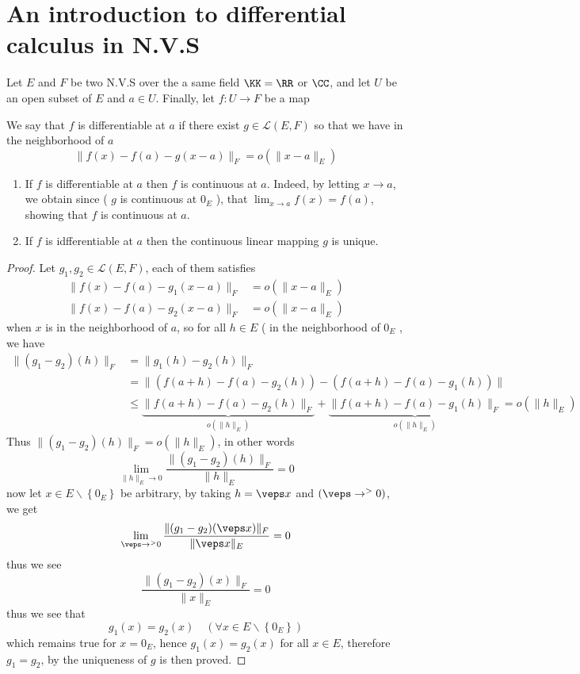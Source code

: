 \section{An introduction to differential calculus in N.V.S}
Let $E $ and $F $ be two N.V.S over the a same
field $\KK = \RR  $ or $\CC  $, and let $U $ be an open 
subset of $E $ and $a \in U $. Finally, let 
$ f : U \longrightarrow F $ be a map
\begin{definition}[]
We say that $f $ is differentiable at $a $ if there exist
$g \in  \mathcal{L} (E,F)$ so that we have
in the neighborhood of $a$
\[
\| f(x) -f(a)  - g(x-a)   \| _{F} = 
o \left( \| x-a \|_{E}  \right) 
\]
\end{definition}
\begin{remark}[]
\begin{enumerate}[(1)]
\item  If $f $ is differentiable at $a $ then 
	$f $ is continuous at $a $. Indeed, by letting
	$x \rightarrow a $, we obtain since ( $g $ is continuous
	at $0_{E} $ ), that $\lim_{x \to a} f(x) = f(a)  $, 
	showing that $f $ is continuous at $a $.
\item  If $f $ is idfferentiable at $a $ then the continuous
	linear mapping $g $ is unique.
\end{enumerate}
\end{remark}
\begin{proof}
	Let $g_1,g_2 \in \mathcal{L} (E,F)  $, each of them
	satisfies 
	\begin{align*}
		\| f(x) -f(a) - g_1(x-a)  \| _{F} &=
	o \left( \| x-a \|_{E}  \right)
	\\
		\| f(x) -f(a) - g_2(x-a)  \| _{F} &= 
	o \left( \| x-a \|_{E}  \right)
	\end{align*}
	when $x $ is in the neighborhood of $a$, 
	so for all $h \in E $ ( in the neighborhood of 
	$0_{E} $ , we have 
	\begin{align*}
		\| (g_1-g_2) (h)  \| _{F} &= 
		\| g_1(h) - g_2(h)  \| _{F} \\
	  &=  
	  \| 
	  \left( f(a+h) -f(a) -g_2(h)  \right) - 
	  \left( f(a+h) -f(a) -g_1(h)  \right)
	  \|  \\
	  & \leq 
	  \underbrace{
	  \| f(a+h) -f(a) -g_2(h)  \| _{F}
	  }_{o(\| h \| _{E}) }  + 
	  \underbrace{
	  \| f(a+h) -f(a) -g_1(h)  \| _{F}
	  }_{o(\| h \| _{E})  }  = o
	  (\| h \| _{E}) 
	\end{align*}
	Thus $\| (g_1 - g_2) (h)  \| _{F} = o(\| h \| _{E})  $,
	in other words 
	\[
	\lim_{\| h \| _{E} \to 0} 
	\frac{\| (g_1-g_2) (h)  \| _{F}}{
		\| h \| _{E}
	} = 0
	\]
	now let $x \in  E \backslash \left\{ 0_{E} \right\} $  
	be arbitrary, by taking $h = \veps x  $ and
	$(\veps  \rightarrow^{> } 0)  $, we get 
	\[
	\lim_{\veps  \to ^{> } 0} 
	\frac{
	\| (g_1 - g_2) (\veps x)  \| _{F}
	}{
		\| \veps x \| _{E}
	} = 
	0
	\]
	thus we see 
	\[
		\frac{	
	\| (g_1 - g_2)(x)   \|_{F}
		}{
			\| x \| _{E}
		} = 0
	\]
	thus we see that 
	\[
	g_1(x)  = g_2(x)  \quad 
	\left( \forall  x \in  E \backslash \left\{ 0_{E}
	\right\} \right)
	\]
	which remains true for $x = 0_{E} $, hence
	$g_1 (x) = g_2(x)  $  for all $x \in E $, therefore
	$g_1 = g_2 $, by the uniqueness of $g $ is then
	proved.
\end{proof}
